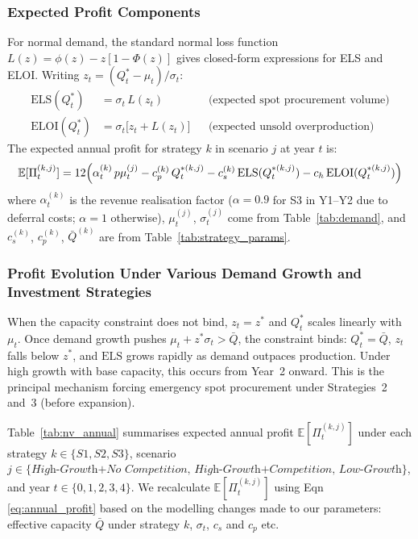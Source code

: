 \documentclass[10pt,a4paper]{article}
\newcommand{\E}{\mathbb{E}}
\begin{document}
\subsubsection{Expected Profit Components}

For normal demand, the standard normal loss function $L(z) = \phi(z) - z[1-\Phi(z)]$ gives closed-form expressions for ELS and ELOI. Writing $z_t = (Q_t^* - \mu_t)/\sigma_t$:
\begin{align}
    \mathrm{ELS}(Q_t^*)  & = \sigma_t\, L(z_t)                &  & \text{(expected spot procurement volume)} \\
    \mathrm{ELOI}(Q_t^*) & = \sigma_t\bigl[z_t + L(z_t)\bigr] &  & \text{(expected unsold overproduction)}
\end{align}
The expected annual profit for strategy $k$ in scenario $j$ at year $t$ is:
\begin{equation}
    \E[\Pi_t^{(k,j)}] = 12\Bigl(\alpha_t^{(k)}\, p\mu_t^{(j)} - c_p^{(k)}\, Q_t^{*(k,j)} - c_s^{(k)}\,\mathrm{ELS}(Q_t^{*(k,j)}) - c_h\,\mathrm{ELOI}(Q_t^{*(k,j)})\Bigr)
    \label{eq:annual_profit}
\end{equation}
where $\alpha_t^{(k)}$ is the revenue realisation factor ($\alpha = 0.9$ for S3 in Y1--Y2 due to deferral costs; $\alpha = 1$ otherwise), $\mu_t^{(j)}$, $\sigma_t^{(j)}$ come from Table~\ref{tab:demand}, and $c_s^{(k)}$, $c_p^{(k)}$, $\bar{Q}^{(k)}$ are from Table~\ref{tab:strategy_params}.

\subsubsection{Profit Evolution Under Various Demand Growth and Investment Strategies}

When the capacity constraint does not bind, $z_t = z^*$ and $Q_t^*$ scales linearly with $\mu_t$. Once demand growth pushes $\mu_t + z^*\sigma_t > \bar{Q}$, the constraint binds: $Q_t^* = \bar{Q}$, $z_t$ falls below $z^*$, and $\mathrm{ELS}$ grows rapidly as demand outpaces production. Under high growth with base capacity, this occurs from Year~2 onward. This is the principal mechanism forcing emergency spot procurement under Strategies~2 and~3 (before expansion).

Table~\ref{tab:nv_annual} summarises expected annual profit $\E[\Pi_t^{(k,j)}]$ under each strategy $k \in \{S1, S2, S3\}$, scenario $j \in \{\textit{High-Growth+No Competition, High-Growth+Competition, Low-Growth}\}$, and year $t \in \{0,1,2,3,4\}$. We recalculate $\E[\Pi_t^{(k,j)}]$ using Eqn \ref{eq:annual_profit} based on the modelling changes made to our parameters: effective capacity $\bar{Q}$ under strategy $k$, $\sigma_t$, $c_s$ and $c_p$ etc.
\end{document}
